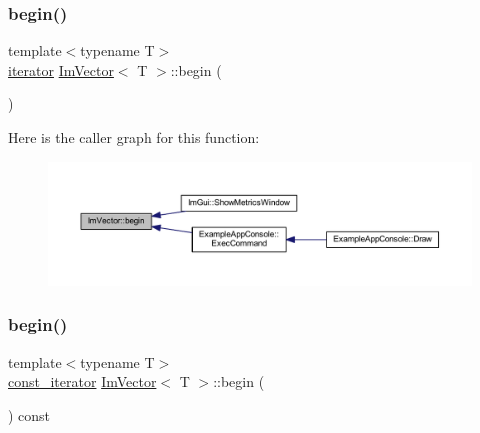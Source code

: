 \subsubsection{\texorpdfstring{begin()}{begin()}\hspace{0.1cm}{\footnotesize\ttfamily [1/2]}}
{\footnotesize\ttfamily template$<$typename T$>$ \\
\mbox{\hyperlink{class_im_vector_a74b5478f1f6fd471cc71219bce483db6}{iterator}} \mbox{\hyperlink{class_im_vector}{Im\+Vector}}$<$ T $>$\+::begin (\begin{DoxyParamCaption}{ }\end{DoxyParamCaption})\hspace{0.3cm}{\ttfamily [inline]}}

Here is the caller graph for this function\+:
\nopagebreak
\begin{figure}[H]
\begin{center}
\leavevmode
\includegraphics[width=350pt]{class_im_vector_a300a8b559cd87a78063046ef81151bce_icgraph}
\end{center}
\end{figure}
\mbox{\label{class_im_vector_ac72cd4105b5c6a7f76157df945b39d4c}} 
\subsubsection{\texorpdfstring{begin()}{begin()}\hspace{0.1cm}{\footnotesize\ttfamily [2/2]}}
{\footnotesize\ttfamily template$<$typename T$>$ \\
\mbox{\hyperlink{class_im_vector_aedeac9c5080f9d6ce96ae837768ee4c4}{const\+\_\+iterator}} \mbox{\hyperlink{class_im_vector}{Im\+Vector}}$<$ T $>$\+::begin (\begin{DoxyParamCaption}{ }\end{DoxyParamCaption}) const\hspace{0.3cm}{\ttfamily [inline]}}

\mbox{\label{class_im_vector_ac17681baa8b9b5cd97e556da29f9ef73}} 
